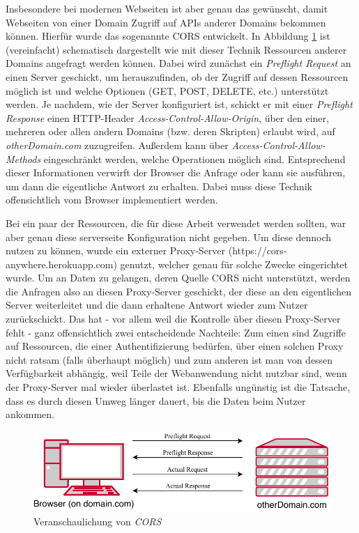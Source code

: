 Insbesondere bei modernen Webseiten ist aber genau das gewünscht, damit Webseiten von einer Domain Zugriff auf \acsp{API} anderer Domains bekommen können. Hierfür wurde das sogenannte \acf{CORS} entwickelt. In Abbildung \ref{fig:technologies:prog:cors} ist (vereinfacht) schematisch dargestellt wie mit dieser Technik Ressourcen anderer Domains angefragt werden können. Dabei wird zunächst ein \textit{Preflight Request} an einen Server geschickt, um herauszufinden, ob der Zugriff auf dessen Ressourcen möglich ist und welche Optionen (GET, POST, DELETE, etc.) unterstützt werden. Je nachdem, wie der Server konfiguriert ist, schickt er mit einer \textit{Preflight Response} einen \acs{HTTP}-Header \textit{Access-Control-Allow-Origin}, über den einer, mehreren oder allen andern Domains (bzw. deren Skripten) erlaubt wird, auf \textit{otherDomain.com} zuzugreifen. Außerdem kann über \textit{Access-Control-Allow-Methods} eingeschränkt werden, welche Operationen möglich sind. Entsprechend dieser Informationen verwirft der Browser die Anfrage oder kann sie ausführen, um dann die eigentliche Antwort zu erhalten. Dabei muss diese Technik offensichtlich vom Browser implementiert werden\cite{CORSiA}.

Bei ein paar der Ressourcen, die für diese Arbeit verwendet werden sollten, war aber genau diese serverseite Konfiguration nicht gegeben. Um diese dennoch nutzen zu können, wurde ein externer Proxy-Server (https://cors-anywhere.herokuapp.com) genutzt, welcher genau für solche Zwecke eingerichtet wurde. Um an Daten zu gelangen, deren Quelle \acs{CORS} nicht unterstützt, werden die Anfragen also an diesen Proxy-Server geschickt, der diese an den eigentlichen Server weiterleitet und die dann erhaltene Antwort wieder zum Nutzer zurückschickt. Das hat - vor allem weil die Kontrolle über diesen Proxy-Server fehlt - ganz offensichtlich zwei entscheidende Nachteile: Zum einen sind Zugriffe auf Ressourcen, die einer Authentifizierung bedürfen, über einen solchen Proxy nicht ratsam (falls überhaupt möglich) und zum anderen ist man von dessen Verfügbarkeit abhängig, weil Teile der Webanwendung nicht nutzbar sind, wenn der Proxy-Server mal wieder überlastet ist. Ebenfalls ungünstig ist die Tatsache, dass es durch diesen Umweg länger dauert, bis die Daten beim Nutzer ankommen.

\begin{figure}[h]
\centering
\includegraphics{gfx/CORS}
\caption[Veranschaulichung von \textit{\acf{CORS}}]{Veranschaulichung von \textit{\acf{CORS}\cite{CORSImg}}}
\label{fig:technologies:prog:cors}
\end{figure}

